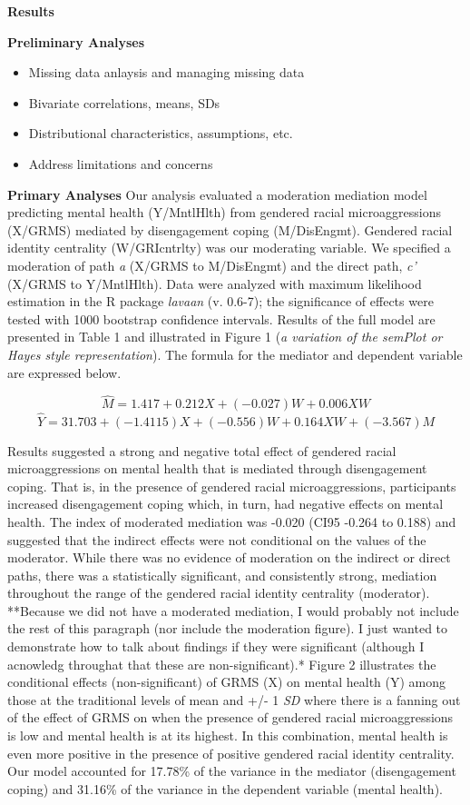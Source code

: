 \documentclass[
]{book}
\providecommand{\tightlist}{%
  \setlength{\itemsep}{0pt}\setlength{\parskip}{0pt}}
\begin{document}
\textbf{Results}

\textbf{Preliminary Analyses}

\begin{itemize}
\tightlist
\item
  Missing data anlaysis and managing missing data
\item
  Bivariate correlations, means, SDs
\item
  Distributional characteristics, assumptions, etc.
\item
  Address limitations and concerns
\end{itemize}

\textbf{Primary Analyses}
Our analysis evaluated a moderation mediation model predicting mental health (Y/MntlHlth) from gendered racial microaggressions (X/GRMS) mediated by disengagement coping (M/DisEngmt). Gendered racial identity centrality (W/GRIcntrlty) was our moderating variable. We specified a moderation of path \emph{a} (X/GRMS to M/DisEngmt) and the direct path, \emph{c'} (X/GRMS to Y/MntlHlth). Data were analyzed with maximum likelihood estimation in the R package \emph{lavaan} (v. 0.6-7); the significance of effects were tested with 1000 bootstrap confidence intervals. Results of the full model are presented in Table 1 and illustrated in Figure 1 (\emph{a variation of the semPlot or Hayes style representation}). The formula for the mediator and dependent variable are expressed below.

\[\hat{M} = 1.417 + 0.212X + (-0.027) W + 0.006XW\]
\[\hat{Y} = 31.703 + (-1.4115)X + (-0.556)W + 0.164XW + (-3.567)M\]

Results suggested a strong and negative total effect of gendered racial microaggressions on mental health that is mediated through disengagement coping. That is, in the presence of gendered racial microaggressions, participants increased disengagement coping which, in turn, had negative effects on mental health. The index of moderated mediation was -0.020 (CI95 -0.264 to 0.188) and suggested that the indirect effects were not conditional on the values of the moderator. While there was no evidence of moderation on the indirect or direct paths, there was a statistically significant, and consistently strong, mediation throughout the range of the gendered racial identity centrality (moderator). **Because we did not have a moderated mediation, I would probably not include the rest of this paragraph (nor include the moderation figure). I just wanted to demonstrate how to talk about findings if they were significant (although I acnowledg throughat that these are non-significant).* Figure 2 illustrates the conditional effects (non-significant) of GRMS (X) on mental health (Y) among those at the traditional levels of mean and +/- 1 \emph{SD} where there is a fanning out of the effect of GRMS on when the presence of gendered racial microaggressions is low and mental health is at its highest. In this combination, mental health is even more positive in the presence of positive gendered racial identity centrality. Our model accounted for 17.78\% of the variance in the mediator (disengagement coping) and 31.16\% of the variance in the dependent variable (mental health).
\end{document}
